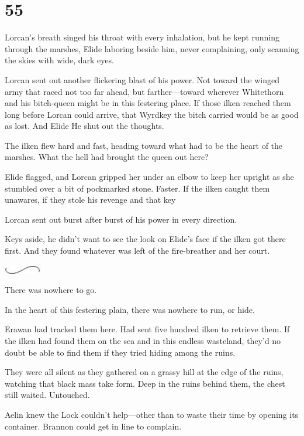 
\chapter{55}

Lorcan's breath singed his throat with every inhalation, but he kept running through the marshes, Elide laboring beside him, never complaining, only scanning the skies with wide, dark eyes.

Lorcan sent out another flickering blast of his power. Not toward the winged army that raced not too far ahead, but farther---toward wherever Whitethorn and his bitch-queen might be in this festering place. If those ilken reached them long before Lorcan could arrive, that Wyrdkey the bitch carried would be as good as lost. And Elide  He shut out the thoughts.

The ilken flew hard and fast, heading toward what had to be the heart of the marshes. What the hell had brought the queen out here?

Elide flagged, and Lorcan gripped her under an elbow to keep her upright as she stumbled over a bit of pockmarked stone. Faster. If the ilken caught them unawares, if they stole his revenge and that key 

Lorcan sent out burst after burst of his power in every direction.

Keys aside, he didn't want to see the look on Elide's face if the ilken got there first. And they found whatever was left of the fire-breather and her court.

\includegraphics[width=0.65in,height=0.13in]{images/seperator}

There was nowhere to go.

In the heart of this festering plain, there was nowhere to run, or hide.

Erawan had tracked them here. Had sent five hundred ilken to retrieve them. If the ilken had found them on the sea and in this endless wasteland, they'd no doubt be able to find them if they tried hiding among the ruins.

They were all silent as they gathered on a grassy hill at the edge of the ruins, watching that black mass take form. Deep in the ruins behind them, the chest still waited. Untouched.

Aelin knew the Lock couldn't help---other than to waste their time by opening its container. Brannon could get in line to complain.

